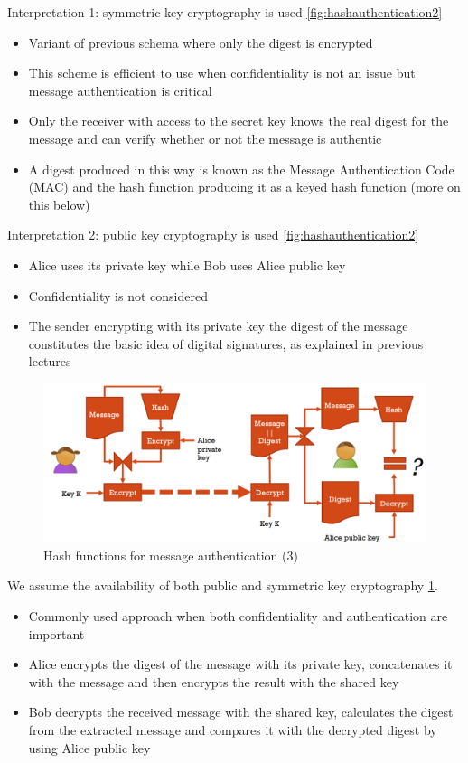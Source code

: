 Interpretation 1: symmetric key cryptography is used  \ref{fig:hashauthentication2}
\begin{itemize}
	\item Variant of previous schema where only the digest is encrypted
	\item This scheme is efficient to use when confidentiality is not an issue but message authentication is critical
	\item Only the receiver with access to the secret key knows the real digest for the message and can verify whether or not the message is authentic
	\item A digest produced in this way is known as the Message Authentication Code (MAC) and the hash function producing it as a keyed hash function (more on this below)
\end{itemize}

Interpretation 2: public key cryptography is used \ref{fig:hashauthentication2}
\begin{itemize}
	\item Alice uses its private key while Bob uses Alice public key
	\item Confidentiality is not considered
	\item The sender encrypting with its private key the digest of the message constitutes the basic idea of digital signatures, as explained in previous lectures
\end{itemize}


\begin{figure}
	\centering
	\includegraphics[width=0.7\linewidth]{Images/Chapter6/hash_authentication3}
	\caption{Hash functions for message authentication (3)}
	\label{fig:hashauthentication3}
\end{figure}

We assume the availability of both public and symmetric key cryptography \ref{fig:hashauthentication3}.
\begin{itemize}
	\item Commonly used approach when both confidentiality and authentication are important
	\item Alice encrypts the digest of the message with its private key, concatenates it with the message and then encrypts the result with the shared key
	\item  Bob decrypts the received message with the shared key, calculates the digest from the extracted message and compares it with the decrypted digest by using Alice public key
\end{itemize}


